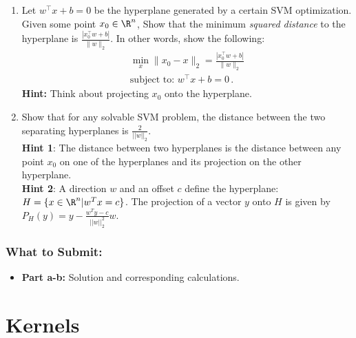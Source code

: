 \documentclass{article}
\begin{document}
\begin{bprob}
    \begin{enumerate}
        \item {} Let $w^\top x + b=0$ be the hyperplane generated by a certain SVM optimization. Given some point $x_0 \in \R^n$, Show that the minimum \emph{squared distance} to the hyperplane is $\frac{|x_0^\top w + b|}{\|w\|_2}$.
    	In other words, show the following:
    	\begin{align*}
        	\min_x \|x_0 - x\|_2 = \frac{|x_0^\top w + b|}{\|w\|_2}\\
        	\text{subject to: } w^\top x +b = 0\, .
    	\end{align*}
    	\textbf{Hint:} Think about projecting $x_0$ onto the hyperplane.
    	
        \item {} Show that for any solvable SVM problem, the distance between the two separating hyperplanes is $\frac{2}{||w||_2}$. \\
        
        \textbf{Hint 1}: The distance between two hyperplanes is the distance between any point $x_0$ on one of the hyperplanes and its projection on the other hyperplane. \\
        \textbf{Hint 2}: A direction $w$ and an offset $c$ define the hyperplane: $H = \{x \in \R^n | w^Tx = c\}$. The projection of a vector $y$ onto $H$ is given by $P_H(y) = y - \frac{w^Ty - c}{||w||^2_2}w$.
    \end{enumerate}
    \subsubsection*{What to Submit:}
    \begin{itemize}
        \item \textbf{Part a-b:} Solution and corresponding calculations.
    \end{itemize}
\end{bprob}

\section*{Kernels}
\end{document}
